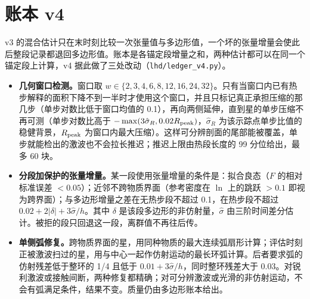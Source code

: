 \section{账本 v4}
v3 的混合估计只在末时刻比较一次张量值与多边形值，一个坏的张量增量会使此后整段记录都退回多边形值。账本是各锚定段增量之和，两种估计都可以在同一个锚定段上计算，v4 据此做了三处改动（\texttt{lhd/ledger\_v4.py}）。
\begin{itemize}
\item \textbf{几何窗口检测。}窗口取 $w\in\{2,3,4,6,8,12,16,24,32\}$。只有当窗口内已有热步解释的面积下降不到一半时才使用这个窗口，并且只标记真正承担压缩的那几步（单步对数比低于窗口均值的 0.1），再向两侧延伸，直到星的单步压缩不再可测（单步对数比高于 $-\max(3\hat\sigma_R,0.02R_{\rm peak})$，$\hat\sigma_R$ 为该示踪点单步比值的稳健背景，$R_{\rm peak}$ 为窗口内最大压缩）。这样可分辨剖面的尾部能被覆盖，单步就能检出的激波也不会拉长推迟；推迟上限由热段长度的 99 分位给出，最多 60 块。
\item \textbf{分段加保护的张量增量。}某一段使用张量增量的条件是：拟合良态（$F$ 的相对标准误差 $<0.05$）；近邻不跨物质界面（参考密度在 $\ln$ 上的跳跃 $>0.1$ 即视为跨界面）；与多边形增量之差在无热步段不超过 0.1，在热步段不超过 $0.02+2|\delta|+3\hat\sigma/h$。其中 $\delta$ 是该段多边形的非仿射量，$\hat\sigma$ 由三阶时间差分估计。被拒的段只回退这一段，离群值不再往后传。
\item \textbf{单侧弧修复。}跨物质界面的星，用同种物质的最大连续弧扇形计算；评估时刻正被激波扫过的星，用与中心一起作仿射运动的最长环弧计算。后者要求弧的仿射残差低于整环的 1/4 且低于 $0.01+3\hat\sigma/h$，同时整环残差大于 0.03。对锐利激波或接触间断，两种修复都精确；对可分辨激波或光滑的非仿射运动，不会有弧满足条件，结果不变。质量仍由多边形账本给出。
\end{itemize}
